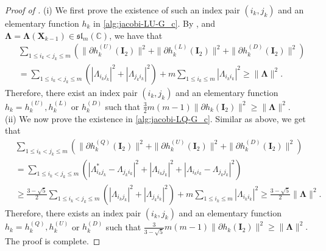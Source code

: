 \documentclass[final,onefignum,onetabnum]{siamart190516}
\newcommand{\matr}[1]{\boldsymbol{#1}}
\newcommand{\CC}{\mathbb{C}}
\newcommand{\sll}{\mathfrak{sl}}
\begin{document}
\begin{proof}[Proof of ]
(i) We first prove the existence of such an index pair $(i_k,j_k)$ and an elementary function $h_{k}$ in \autoref{alg:jacobi-LU-G_c}. 
By ,  and $\matr{\Lambda}=\matr{\Lambda}(\matr{X}_{k-1})\in\sll_{m}(\CC)$, we have that 
\begin{align*}
&\sum_{1\leq i_k<j_k\leq m}  \left(\|\partial h^{(U)}_k(\matr{I}_2)\|^2+\|\partial h^{(L)}_k(\matr{I}_2)\|^2+\|\partial h^{(D)}_k(\matr{I}_2)\|^2\right) \\
&= \sum_{1\leq i_k<j_k\leq m} \left(|\Lambda_{i_kj_k}|^2 + |\Lambda_{j_ki_k}|^2\right) + m\sum_{1\leq i_k\leq m} |\Lambda_{i_ki_k}|^2 \geq \|\matr{\Lambda}\|^2. 
\end{align*}
Therefore, there exist an index pair $(i_k,j_k)$ and an elementary function $h_k=h^{(U)}_k, h^{(L)}_k$ or $h^{(D)}_k$ such that $\frac{3}{2}m(m-1)\|\partial h_k(\matr{I}_2)\|^2\geq\|\matr{\Lambda}\|^2$. \\
(ii) We now prove the existence in \autoref{alg:jacobi-LQ-G_c}. 
Similar as above, 
we get that 
\begin{align*}
&\sum_{1\leq i_k<j_k\leq m}  \left(\|\partial h^{(Q)}_k(\matr{I}_2)\|^2+\|\partial h^{(U)}_k(\matr{I}_2)\|^2 + \|\partial h^{(D)}_k(\matr{I}_2) \|^2\right) \\
&= \sum_{1\leq i_k<j_k\leq m}  \left(|\Lambda_{i_kj_k}^{*} - \Lambda_{j_ki_k}|^2+|\Lambda_{i_kj_k}|^2 + |\Lambda_{i_ki_k} - \Lambda_{j_kj_k}|^2\right)\\
&\geq \frac{3-\sqrt{5}}{2}\sum_{1\leq i_k<j_k\leq m} \left(|\Lambda_{i_kj_k}|^2 + |\Lambda_{j_ki_k}|^2\right) + m\sum_{1\leq i_k\leq m} |\Lambda_{i_ki_k}|^2
\geq \frac{3-\sqrt{5}}{2}\|\matr{\Lambda}\|^2. 
\end{align*}
Therefore, there exists an index pair $(i_k,j_k)$ and an elementary function $h_k =h^{(Q)}_k, h^{(U)}_k$ or $h^{(D)}_k$ such that
$\frac{3}{3-\sqrt{5}}m(m-1)\|\partial h_k(\matr{I}_2)\|^2\geq\|\matr{\Lambda}\|^2.$
The proof is complete. 
\end{proof}
\end{document}
